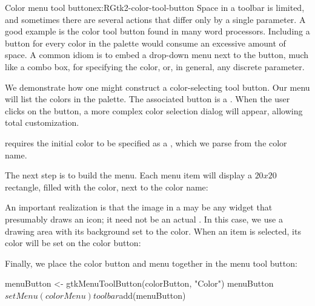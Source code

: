 \begin{example}{Color menu tool button}{ex:RGtk2-color-tool-button}
Space in a toolbar is limited, and sometimes there are several actions
that differ only by a single parameter. A good example is the color
tool button found in many word processors. Including a button for
every color in the palette would consume an excessive amount of
space. A common idiom is to embed a drop-down menu next to the button,
much like a combo box, for specifying the color, or, in general, any
discrete parameter.

We demonstrate how one might construct a color-selecting tool
button. Our menu will list the colors in the \R\/ palette. The
associated button is a . When the user
clicks on the button, a more complex color selection dialog will
appear, allowing total customization.
\begin{Schunk}
\end{Schunk}
% 
 requires the initial color to be specified
as a , which we parse from the \R\/ color name.

The next step is to build the menu. Each menu item will display a
$20x20$ rectangle, filled with the color, next to the color name:
\begin{Schunk}
\end{Schunk}
%
An important realization is that the image in a
 may be any widget that presumably draws an
icon; it need not be an actual . In this case, we use
a drawing area with its background set to the color.  When an item is
selected, its color will be set on the color button:
\begin{Schunk}
\end{Schunk}

Finally, we place the color button and menu together in the menu tool
button:
\begin{Schunk}
\begin{Sinput}
 menuButton <- gtkMenuToolButton(colorButton, "Color")
 menuButton$setMenu(colorMenu)
 toolbar$add(menuButton)
\end{Sinput}
\end{Schunk}
\end{example}
  
